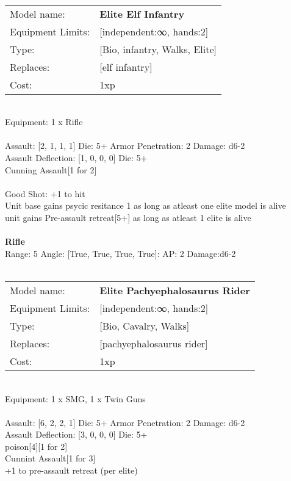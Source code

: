  
\ \\

\noindent
\begin{tabular}{ll}
Model name: &{\bf Elite Elf Infantry } \\
Equipment Limits: &[independent:∞, hands:2] \\
Type: &[Bio, infantry, Walks, Elite] \\
Replaces: &[elf infantry] \\
Cost: & 1xp\\
\end{tabular}
\ \\
Equipment: 1 x Rifle \\
\ \\
Assault: [2, 1, 1, 1] Die: 5+ Armor Penetration: 2 Damage: d6-2 \\
Assault Deflection: [1, 0, 0, 0] Die: 5+\\
\indent Cunning Assault[1 for 2]\\ 
 
\ \\
Good Shot: +1 to hit\\ 
Unit base gains psycic resitance 1 as long as atleast one elite model is alive\\ 
unit gains Pre-assault retreat[5+] as long as atleast 1 elite is alive\\ 

\ \\
{\bf Rifle } \\



Range: 5  Angle: [True, True, True, True]: AP: 2 Damage:d6-2 \\




 
\ \\

\noindent
\begin{tabular}{ll}
Model name: &{\bf Elite Pachyephalosaurus Rider } \\
Equipment Limits: &[independent:∞, hands:2] \\
Type: &[Bio, Cavalry, Walks] \\
Replaces: &[pachyephalosaurus rider] \\
Cost: & 1xp\\
\end{tabular}
\ \\
Equipment: 1 x SMG, 1 x Twin Guns \\
\ \\
Assault: [6, 2, 2, 1] Die: 5+ Armor Penetration: 2 Damage: d6-2 \\
Assault Deflection: [3, 0, 0, 0] Die: 5+\\
\indent poison[4][1 for 2]\\ 
Cunnint Assault[1 for 3]\\ 
+1 to pre-assault retreat (per elite)\\ 
 
